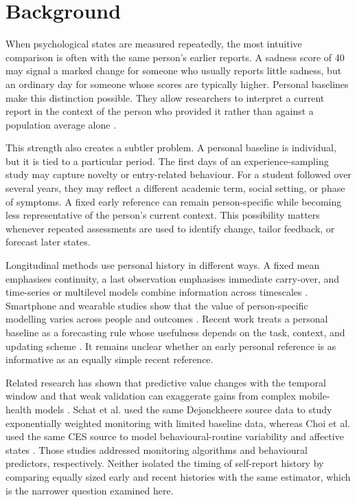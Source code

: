 \documentclass[pdflatex,sn-vancouver-num]{sn-jnl}
\begin{document}

\maketitle

\section{Background}

When psychological states are measured repeatedly, the most intuitive comparison is often with the same person's earlier reports. A sadness score of 40 may signal a marked change for someone who usually reports little sadness, but an ordinary day for someone whose scores are typically higher. Personal baselines make this distinction possible. They allow researchers to interpret a current report in the context of the person who provided it rather than against a population average alone \cite{ref1,ref2,ref3}.

This strength also creates a subtler problem. A personal baseline is individual, but it is tied to a particular period. The first days of an experience-sampling study may capture novelty or entry-related behaviour. For a student followed over several years, they may reflect a different academic term, social setting, or phase of symptoms. A fixed early reference can remain person-specific while becoming less representative of the person's current context. This possibility matters whenever repeated assessments are used to identify change, tailor feedback, or forecast later states.

Longitudinal methods use personal history in different ways. A fixed mean emphasises continuity, a last observation emphasises immediate carry-over, and time-series or multilevel models combine information across timescales \cite{ref2,ref5,ref7}. Smartphone and wearable studies show that the value of person-specific modelling varies across people and outcomes \cite{ref8,ref9,ref10}. Recent work treats a personal baseline as a forecasting rule whose usefulness depends on the task, context, and updating scheme \cite{ref20}. It remains unclear whether an early personal reference is as informative as an equally simple recent reference.

Related research has shown that predictive value changes with the temporal window and that weak validation can exaggerate gains from complex mobile-health models \cite{ref18,ref19}. Schat et al. used the same Dejonckheere source data to study exponentially weighted monitoring with limited baseline data, whereas Choi et al. used the same CES source to model behavioural-routine variability and affective states \cite{ref21,ref23}. Those studies addressed monitoring algorithms and behavioural predictors, respectively. Neither isolated the timing of self-report history by comparing equally sized early and recent histories with the same estimator, which is the narrower question examined here.
\end{document}
